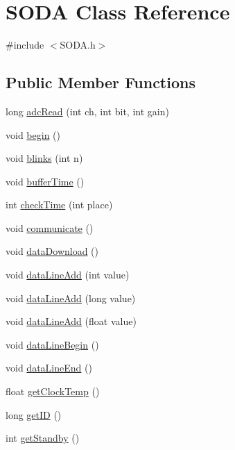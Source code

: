 \hypertarget{class_s_o_d_a}{\section{S\-O\-D\-A Class Reference}
\label{class_s_o_d_a}
}


{\ttfamily \#include $<$S\-O\-D\-A.\-h$>$}

\subsection*{Public Member Functions}
\begin{DoxyCompactItemize}
\item 
long \hyperlink{class_s_o_d_a_a30b86308dcb295c5e86b79049d3bafdd}{adc\-Read} (int ch, int bit, int gain)
\item 
void \hyperlink{class_s_o_d_a_a95ec5e2456f6402478c101dad0b735ce}{begin} ()
\item 
void \hyperlink{class_s_o_d_a_af1752112fc06931fa9634f48cf65e420}{blinks} (int n)
\item 
void \hyperlink{class_s_o_d_a_a93c1adcc876e1681db69d992153ffb28}{buffer\-Time} ()
\item 
int \hyperlink{class_s_o_d_a_a9cca81f7fda16982cc1eb4030774425b}{check\-Time} (int place)
\item 
void \hyperlink{class_s_o_d_a_a15a8c710209fd041f14bb448fd17c9b2}{communicate} ()
\item 
void \hyperlink{class_s_o_d_a_a6a65882362bba508fbc8c0d5e45badc1}{data\-Download} ()
\item 
void \hyperlink{class_s_o_d_a_a00647a29fb7b491d5e455b8b099da5e0}{data\-Line\-Add} (int value)
\item 
void \hyperlink{class_s_o_d_a_a1c38451ceb71b3e644eb16c11fcfacd7}{data\-Line\-Add} (long value)
\item 
void \hyperlink{class_s_o_d_a_aa5263a65ba6929e23c85bc0d47bbae32}{data\-Line\-Add} (float value)
\item 
void \hyperlink{class_s_o_d_a_a8cd44297bace9494ed073fec5ebfe13a}{data\-Line\-Begin} ()
\item 
void \hyperlink{class_s_o_d_a_a3bdf9101301e2781fe899cb52a59820b}{data\-Line\-End} ()
\item 
float \hyperlink{class_s_o_d_a_abce8c3a638c71d842ab79af3120138c5}{get\-Clock\-Temp} ()
\item 
long \hyperlink{class_s_o_d_a_a01ecfd6c2f14d0f5507a4384b34fb46a}{get\-I\-D} ()
\item 
int \hyperlink{class_s_o_d_a_a98719fd95cb6fd3c70f221e62dbf06f4}{get\-Standby} ()

\end{DoxyCompactItemize}
